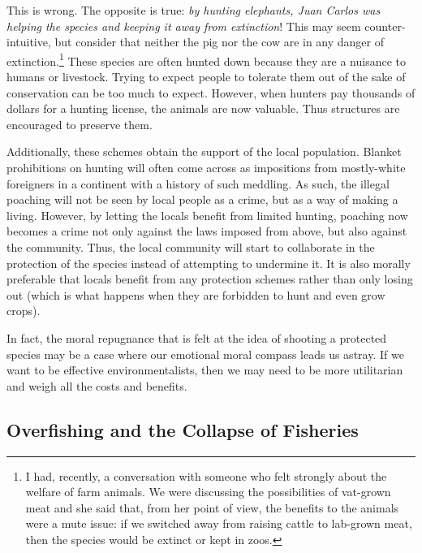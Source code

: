 This is wrong. The opposite is true: \emph{by hunting elephants, Juan Carlos
was helping the species and keeping it away from extinction}! This may seem
counter-intuitive, but consider that neither the pig nor the cow are in any
danger of extinction.\footnote{I had, recently, a conversation with someone who
felt strongly about the welfare of farm animals. We were discussing the
possibilities of vat-grown meat and she said that, from her point of view, the
benefits to the animals were a mute issue: if we switched away from raising
cattle to lab-grown meat, then the species would be extinct or kept in zoos.}
These species are often hunted down because they are a nuisance to humans or
livestock. Trying to expect people to tolerate them out of the sake of
conservation can be too much to expect. However, when hunters pay thousands of
dollars for a hunting license, the animals are now valuable. Thus structures
are encouraged to preserve them.

Additionally, these schemes obtain the support of the local population. Blanket
prohibitions on hunting will often come across as impositions from mostly-white
foreigners in a continent with a history of such meddling. As such, the illegal
poaching will not be seen by local people as a crime, but as a way of making a
living. However, by letting the locals benefit from limited hunting, poaching
now becomes a crime not only against the laws imposed from above, but also
against the community. Thus, the local community will start to collaborate in
the protection of the species instead of attempting to undermine it. It is also
morally preferable that locals benefit from any protection schemes rather than
only losing out (which is what happens when they are forbidden to hunt and even
grow crops).


In fact, the moral repugnance that is felt at the idea of shooting a protected
species may be a case where our emotional moral compass leads us astray. If we
want to be effective environmentalists, then we may need to be more utilitarian
and weigh all the costs and benefits.

\subsection{Overfishing and the Collapse of Fisheries}

